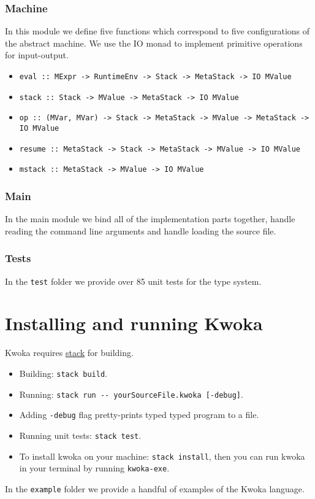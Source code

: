 \documentclass[a4paper]{article}
\begin{document}
\subsubsection*{Machine}
In this module we define five functions which correspond to five configurations of the abstract machine.
We use the IO monad to implement primitive operations for input-output.
\begin{itemize}
  \item \verb+eval :: MExpr -> RuntimeEnv -> Stack -> MetaStack -> IO MValue+
  \item \verb+stack :: Stack -> MValue -> MetaStack -> IO MValue+
  \item \verb+op :: (MVar, MVar) -> Stack -> MetaStack -> MValue -> MetaStack -> IO MValue+
  \item \verb+resume :: MetaStack -> Stack -> MetaStack -> MValue -> IO MValue+
  \item \verb+mstack :: MetaStack -> MValue -> IO MValue+
\end{itemize}

\subsubsection*{Main}

In the main module we bind all of the implementation parts together, handle reading the command line arguments and
handle loading the source file.

\subsubsection*{Tests}
In the \verb+test+ folder we provide over 85 unit tests for the type system.

\section{Installing and running Kwoka}
Kwoka requires {\href{https://docs.haskellstack.org/en/stable/README/}{\color{blue}stack}} for building.
\begin{itemize}
    \item Building: \verb+stack build+.
    \item Running: \verb+stack run -- yourSourceFile.kwoka [-debug]+.
    \item Adding \verb+-debug+ flag pretty-prints typed typed program to a file.
    \item Running unit tests: \verb+stack test+.
    \item To install kwoka on your machine: \verb+stack install+,
          then you can run kwoka in your terminal by running \verb+kwoka-exe+.
\end{itemize}
In the \verb+example+ folder we provide a handful of examples of the Kwoka language.
\end{document}
